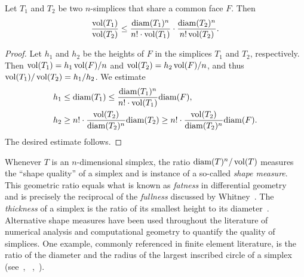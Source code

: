 \documentclass[a4paper]{article}
\begin{document}
\begin{lemma}\label{lemma:volumecomparison}
    Let $T_1$ and $T_2$ be two $n$-simplices that share a common face $F$. Then 
    \begin{align*}
        \frac{ \operatorname{vol}(T_1) }{ \operatorname{vol}(T_2) }
        \leq 
        \frac{{\operatorname{diam}}(T_1)^n}{n! \cdot \operatorname{vol}(T_1)} 
        \cdot 
        \frac{{\operatorname{diam}}(T_2)^n}{n! \operatorname{vol}(T_2)} 
        .
    \end{align*}
\end{lemma}
\begin{proof}
    Let $h_1$ and $h_2$ be the heights of $F$ in the simplices $T_1$ and $T_2$, respectively. 
    Then $\operatorname{vol}(T_1) = h_1 \operatorname{vol}(F)/n$ and $\operatorname{vol}(T_2) = h_2 \operatorname{vol}(F)/n$, and thus $\operatorname{vol}(T_1)/\operatorname{vol}(T_2) = h_1/h_2$.
    We estimate 
    \begin{align*}
        h_1 &\leq {\operatorname{diam}}(T_1) \leq \frac{{\operatorname{diam}}(T_1)^n}{n! \cdot \operatorname{vol}(T_1)} {\operatorname{diam}}(F),
        \\
        h_2 &\geq n! \cdot \frac{\operatorname{vol}(T_2)}{{\operatorname{diam}}(T_2)^n} {\operatorname{diam}}(T_2) \geq n! \cdot \frac{\operatorname{vol}(T_2)}{{\operatorname{diam}}(T_2)^n} {\operatorname{diam}}(F)
        .
    \end{align*}
    The desired estimate follows. 
\end{proof}


\begin{remark}
    Whenever $T$ is an $n$-dimensional simplex, the ratio ${\operatorname{diam}}(T)^n / \operatorname{vol}(T)$ measures the ``shape quality'' of a simplex and is instance of a so-called \emph{shape measure}. 
    This geometric ratio equals what is known as \emph{fatness} in differential geometry~\cite{cheeger1984curvature} and is precisely the reciprocal of the \emph{fullness} discussed by Whitney~\cite{whitney2012geometric}. 
    The \emph{thickness} of a simplex is the ratio of its smallest height to its diameter~\cite{munkres2016elementary}.
    Alternative shape measures have been used throughout the literature of numerical analysis and computational geometry to quantify the quality of simplices.
    One example, commonly referenced in finite element literature, is the ratio of the diameter and the radius of the largest inscribed circle of a simplex 
    (see~\cite[p.61, Definition 5.1]{braess2001finite}, ~\cite[p.97, Definition (4.2.16)]{brenner2008mathematical},~\cite[Definition~11.2]{ern2021finite}). 
\end{remark}
\end{document}
